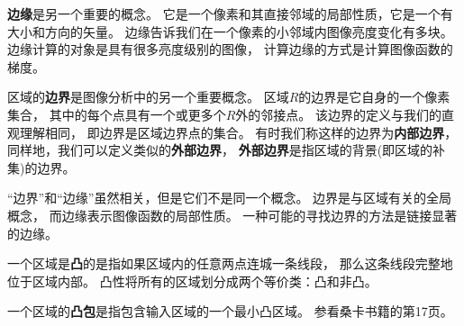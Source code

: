 
\textbf{\color{magenta}边缘}是另一个重要的概念。%
它是一个像素和其直接邻域的局部性质，它是一个有大小和方向的矢量。%
边缘告诉我们在一个像素的小邻域内图像亮度变化有多块。%
边缘计算的对象是具有很多亮度级别的图像，%
计算边缘的方式是计算图像函数的梯度。

区域的\textbf{\color{magenta}边界}是图像分析中的另一个重要概念。%
区域$R$的边界是它自身的一个像素集合，%
其中的每个点具有一个或更多个$R$外的邻接点。%
该边界的定义与我们的直观理解相同，%
即边界是区域边界点的集合。%
有时我们称这样的边界为\textbf{\color{magenta}内部边界}，%
同样地，我们可以定义类似的\textbf{\color{magenta}外部边界}，%
\textbf{\color{magenta}外部边界}是指区域的背景(即区域的补集)的边界。

“边界”和“边缘”虽然相关，但是它们不是同一个概念。%
边界是与区域有关的全局概念，%
而边缘表示图像函数的局部性质。%
一种可能的寻找边界的方法是链接显著的边缘。

一个区域是\textbf{\color{magenta}凸}的是指如果区域内的任意两点连城一条线段，
那么这条线段完整地位于区域内部。%
凸性将所有的区域划分成两个等价类：凸和非凸。%

一个区域的\textbf{\color{magenta}凸包}是指包含输入区域的一个最小凸区域。%
参看桑卡书籍的第17页。

